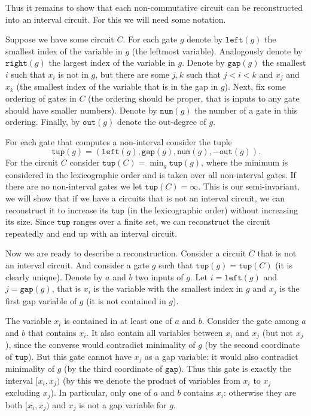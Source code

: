 \documentclass[11pt,letterpaper]{article}
\newcommand{\lef}{\texttt{left}}
\newcommand{\righ}{\texttt{right}}
\newcommand{\gap}{\texttt{gap}}
\newcommand{\num}{\texttt{num}}
\newcommand{\out}{\texttt{out}}
\newcommand{\tup}{\texttt{tup}}
\begin{document}
Thus it remains to show that each non-commutative circuit can be reconstructed into an interval circuit. For this we will need some notation.

Suppose we have some circuit $C$. For each gate $g$ denote by $\lef(g)$ the smallest index of the variable in $g$ (the leftmost variable). Analogously denote by $\righ(g)$ the largest index of the variable in $g$. Denote by $\gap(g)$ the smallest $i$ such that $x_i$ is not in $g$, but there are some $j,k$ such that $j<i<k$ and $x_j$ and $x_k$ (the smallest index of the variable that is in the gap in $g$).
Next, fix some ordering of gates in $C$ (the ordering should be proper, that is inputs to any gate should have smaller numbers). Denote by $\num(g)$ the number of a gate in this ordering. Finally, by $\out(g)$ denote the out-degree of $g$.

For each gate that computes a non-interval consider the tuple
$$
\tup(g)=(\lef(g),\gap(g),\num(g),-\out(g)).
$$ For the circuit $C$ consider $\tup(C) = \min_g \tup(g)$, where the minimum is considered in the lexicographic order and is taken over all non-interval gates. If there are no non-interval gates we let $\tup(C)=\infty$. This is our semi-invariant, we will show that if we have a circuits that is not an interval circuit, we can reconstruct it to increase  its $\tup$ (in the lexicographic order) without increasing its size. Since $\tup$ ranges over a finite set, we can reconstruct the circuit repeatedly and end up with an interval circuit.

Now we are ready to describe a reconstruction. Consider a circuit $C$ that is not an interval circuit. And consider a gate $g$ such that $\tup(g)=\tup(C)$ (it is clearly unique). Denote by $a$ and $b$ two inputs of $g$. Let $i=\lef(g)$ and $j=\gap(g)$, that is $x_i$ is the variable with the smallest index in $g$ and $x_j$ is the first gap variable of $g$ (it is not contained in $g$).

The variable $x_i$ is contained in at least one of $a$ and $b$. Consider the gate among $a$ and $b$ that contains $x_i$. It also contain all variables between $x_i$ and $x_j$ (but not $x_j$), since the converse would contradict minimality of $g$ (by the second coordinate of $\tup$). But this gate cannot have $x_j$ as a gap variable: it would also contradict minimality of $g$ (by the third coordinate of $\gap$). Thus this gate is exactly the interval $[x_i,x_j)$ (by this we denote the product of variables from $x_i$ to $x_j$ excluding $x_j$). In particular, only one of $a$ and $b$ contains $x_i$: otherwise they are both $[x_i,x_j)$ and $x_j$ is not a gap variable for $g$.
\end{document}
